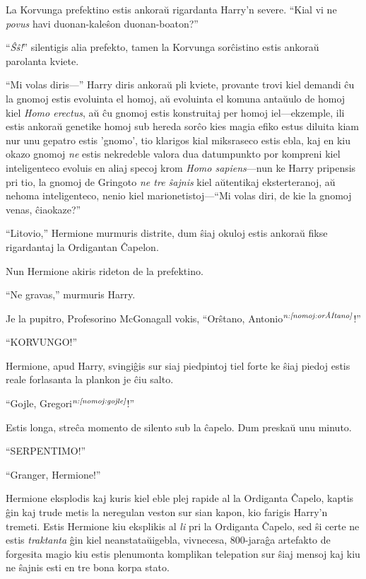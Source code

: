 La Korvunga prefektino estis ankoraŭ rigardanta Harry'n severe. ``Kial
vi ne \emph{povus} havi duonan-kaleŝon duonan-boaton?''

``\emph{Ŝŝ!}'' silentigis alia prefekto, tamen la Korvunga sorĉistino
estis ankoraŭ parolanta kviete.

``Mi volas diris—'' Harry diris ankoraŭ pli kviete, provante trovi
kiel demandi ĉu la gnomoj estis evoluinta el homoj, aŭ evoluinta el
komuna antaŭulo de homoj kiel \emph{Homo erectus}, aŭ ĉu gnomoj estis
konstruitaj per homoj iel—ekzemple, ili estis ankoraŭ genetike homoj
sub hereda sorĉo kies magia efiko estus diluita kiam nur unu gepatro
estis 'gnomo', tio klarigos kial miksraseco estis ebla, kaj en kiu
okazo gnomoj \emph{ne} estis nekredeble valora dua datumpunkto por
kompreni kiel inteligenteco evoluis en aliaj specoj krom \emph{Homo
  sapiens}—nun ke Harry pripensis pri tio, la gnomoj de Gringoto
\emph{ne tre ŝajnis} kiel aŭtentikaj eksterteranoj, aŭ nehoma
inteligenteco, nenio kiel marionetistoj—``Mi volas diri, de kie la
gnomoj venas, ĉiaokaze?''

``Litovio,'' Hermione murmuris distrite, dum ŝiaj okuloj estis ankoraŭ
fikse rigardantaj la Ordigantan Ĉapelon.

Nun Hermione akiris rideton de la prefektino.

``Ne gravas,'' murmuris Harry.

Je la pupitro, Profesorino McGonagall vokis, ``Orŝtano,
Antonio$^{\textit{n:\ref{nomoj:orŝtano}}}$!''

``KORVUNGO!''

Hermione, apud Harry, svingiĝis sur siaj piedpintoj tiel forte ke ŝiaj
piedoj estis reale forlasanta la plankon je ĉiu salto.

``Gojle, Gregori$^{\textit{n:\ref{nomoj:gojle}}}$!''

Estis longa, streĉa momento de silento sub la ĉapelo. Dum preskaŭ unu
minuto.

``SERPENTIMO!''

``Granger, Hermione!''

Hermione eksplodis kaj kuris kiel eble plej rapide al la Ordiganta
Ĉapelo, kaptis ĝin kaj trude metis la neregulan veston sur sian kapon,
kio farigis Harry'n tremeti. Estis Hermione kiu eksplikis al \emph{li}
pri la Ordiganta Ĉapelo, sed ŝi certe ne estis \emph{traktanta} ĝin
kiel neanstataŭigebla, vivnecesa, 800-jaraĝa artefakto de forgesita
magio kiu estis plenumonta komplikan telepation sur ŝiaj mensoj kaj
kiu ne ŝajnis esti en tre bona korpa stato.

